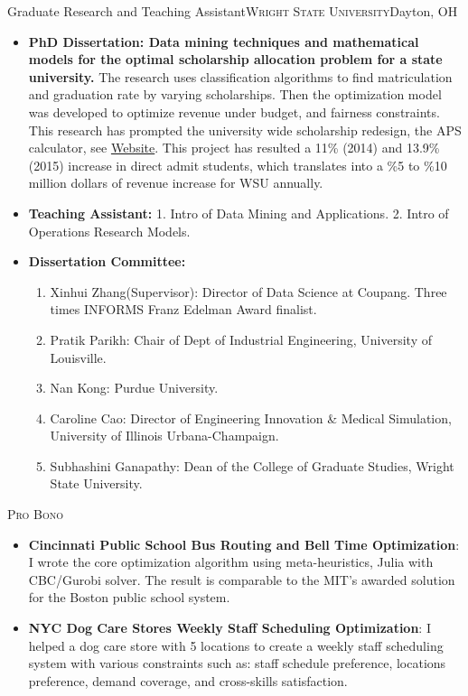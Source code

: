 \documentclass[12pt,a4paper,sans]{moderncv} %
\begin{document}
\bigskip

 {Graduate Research and Teaching
Assistant}{\textsc{Wright State University}}{Dayton, OH}{}
{}
\begin{itemize}
\item \textbf{PhD Dissertation: Data mining techniques and mathematical models for the optimal scholarship allocation problem for a state university.}
The research uses classification algorithms to find
matriculation and graduation rate by varying scholarships. Then the
optimization model was developed to optimize revenue under budget, and fairness constraints.
This research has prompted the university wide scholarship redesign, the APS
calculator, see \href{http://www.wright.edu/raider-connect/financial-aid/first-year-scholarships}{Website}. 
This project has resulted a 11\% (2014) and 13.9\% (2015) increase in direct admit
students, which translates into a \%5 to \%10 million dollars of revenue increase
for WSU annually.
\item \textbf{Teaching Assistant:}
1. Intro of Data Mining and Applications. 
2. Intro of Operations Research Models.
\item \textbf{Dissertation Committee:}
    \begin{enumerate}
\item Xinhui Zhang(Supervisor): Director of Data Science at Coupang. Three times INFORMS Franz Edelman Award finalist.
\item Pratik Parikh: Chair of Dept of Industrial Engineering, University of Louisville.
\item Nan Kong: Purdue University. 
\item Caroline Cao: Director of Engineering Innovation \& Medical Simulation, University of Illinois Urbana-Champaign.
\item Subhashini Ganapathy: Dean of the College of Graduate Studies, Wright State University.
\end{enumerate}
 \end{itemize}
 
\bigskip

{\textsc{Pro Bono}}{}{}{}{
\begin{itemize}
\item \textbf{Cincinnati Public School Bus Routing and Bell Time Optimization}: I wrote the core optimization algorithm using meta-heuristics, Julia with CBC/Gurobi solver. The result is comparable to the MIT's awarded solution for the Boston public school system.
\item \textbf{NYC Dog Care Stores Weekly Staff Scheduling Optimization}: I helped a dog 
care store with 5 locations to create a weekly staff scheduling system with various 
constraints such as: staff schedule preference, locations preference, demand coverage, and cross-skills satisfaction. 

\end{itemize}


}
\end{document}

